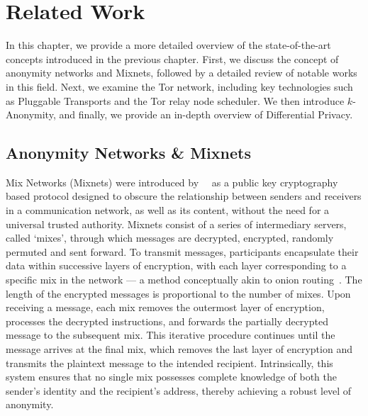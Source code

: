 
%

\chapter{Related Work}\label{cha:related_work}

In this chapter, we provide a more detailed overview of the state-of-the-art concepts introduced in the previous chapter. First, we discuss the concept of anonymity networks and Mixnets, followed by a detailed review of notable works in this field. Next, we examine the Tor network, including key technologies such as Pluggable Transports and the Tor relay node scheduler. We then introduce \(k\)-Anonymity, and finally, we provide an in-depth overview of Differential Privacy.

\section{Anonymity Networks \& Mixnets}\label{sec:anonymity_networks_mixnets}

Mix Networks (Mixnets) were introduced by~\citeauthor{Chaum2003}~\cite{Chaum2003} as a public key cryptography based protocol designed to obscure the relationship between senders and receivers in a communication network, as well as its content, without the need for a universal trusted authority. Mixnets consist of a series of intermediary servers, called `mixes', through which messages are decrypted, encrypted, randomly permuted and sent forward. 
To transmit messages, participants encapsulate their data within successive layers of encryption, with each layer corresponding to a specific mix in the network — a method conceptually akin to onion routing~\cite{OnionRouting}. The length of the encrypted messages is proportional to the number of mixes. Upon receiving a message, each mix removes the outermost layer of encryption, processes the decrypted instructions, and forwards the partially decrypted message to the subsequent mix. This iterative procedure continues until the message arrives at the final mix, which removes the last layer of encryption and transmits the plaintext message to the intended recipient. Intrinsically, this system ensures that no single mix possesses complete knowledge of both the sender's identity and the recipient's address, thereby achieving a robust level of anonymity. 

